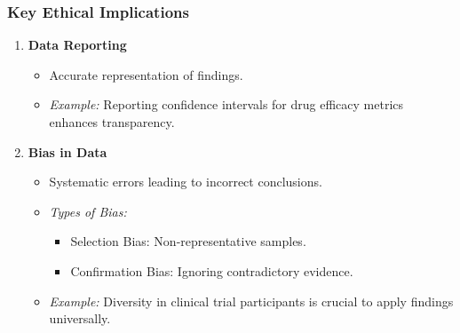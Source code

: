 \documentclass{beamer}
\begin{document}
\begin{frame}[fragile]
    \frametitle{Key Ethical Implications}
    \begin{enumerate}
        \item \textbf{Data Reporting}
            \begin{itemize}
                \item Accurate representation of findings.
                \item \textit{Example:} Reporting confidence intervals for drug efficacy metrics enhances transparency.
            \end{itemize}
        
        \item \textbf{Bias in Data}
            \begin{itemize}
                \item Systematic errors leading to incorrect conclusions.
                \item \textit{Types of Bias:}
                    \begin{itemize}
                        \item Selection Bias: Non-representative samples.
                        \item Confirmation Bias: Ignoring contradictory evidence.
                    \end{itemize}
                \item \textit{Example:} Diversity in clinical trial participants is crucial to apply findings universally.
            \end{itemize}
    \end{enumerate}
\end{frame}
\end{document}

